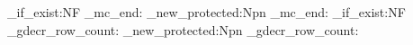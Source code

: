 \ExplSyntaxOn
\cs_if_exist:NF \tag_mc_end:          { \cs_new_protected:Npn \tag_mc_end:          {} }
\cs_if_exist:NF \tbl_gdecr_row_count: { \cs_new_protected:Npn \tbl_gdecr_row_count: {} }
\ExplSyntaxOff



\makeatletter
{}
\makeatother

\usepackage{transparent}
\providecommand{\transparent}[1]{}
\providecommand{\texttransparent}[2]{#2}
\makeatletter
\providecommand{\transparent@use}[1]{}
\makeatother

\newcommand{\InvisibleWatermark}{%
    \transparent{0}{\tiny%
        \NotesAuthor\ --- \NotesCourse\ --- \NotesYear%
    }%
}

\usepackage{atbegshi}
\AtBeginShipout{%
    \AtBeginShipoutUpperLeft{%
        \raisebox{-\paperheight}{\hspace{1cm}\InvisibleWatermark}%
    }%
}

